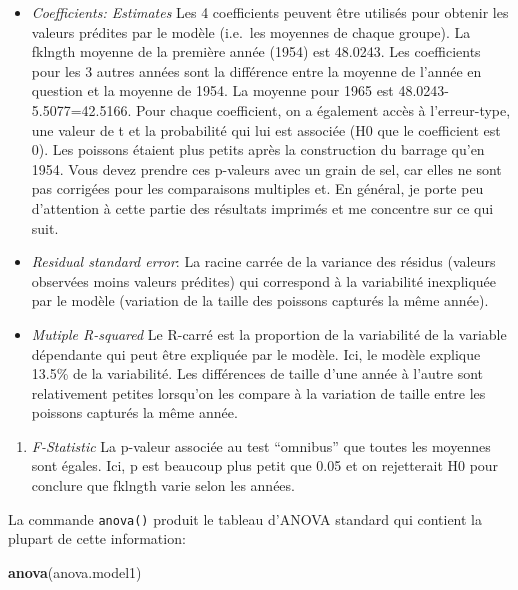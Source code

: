 \documentclass[
  12pt,
]{book}
\newenvironment{Shaded}{\begin{snugshade}}{\end{snugshade}}
\newcommand{\KeywordTok}[1]{\textcolor[rgb]{0.13,0.29,0.53}{\textbf{#1}}}
\newcommand{\NormalTok}[1]{#1}
\providecommand{\tightlist}{%
  \setlength{\itemsep}{0pt}\setlength{\parskip}{0pt}}
\begin{document}
\begin{itemize}
\tightlist
\item
  \emph{Coefficients: Estimates} Les 4 coefficients peuvent être utilisés pour obtenir les valeurs prédites par le modèle (i.e.~les moyennes de chaque groupe). La fklngth moyenne de la première année (1954) est 48.0243. Les coefficients pour les 3 autres années sont la différence entre la moyenne de l'année en question et la moyenne de 1954. La moyenne pour 1965 est 48.0243-5.5077=42.5166. Pour chaque coefficient, on a également accès à l'erreur-type, une valeur de t et la probabilité qui lui est associée (H0 que le coefficient est 0). Les poissons étaient plus petits après la construction du barrage qu'en 1954. Vous devez prendre ces p-valeurs avec un grain de sel, car elles ne sont pas corrigées pour les comparaisons multiples et. En général, je porte peu d'attention à cette partie des résultats imprimés et me concentre sur ce qui suit.
\item
  \emph{Residual standard error}: La racine carrée de la variance des résidus (valeurs observées moins valeurs prédites) qui correspond à la variabilité inexpliquée par le modèle (variation de la taille des poissons capturés la même année).
\item
  \emph{Mutiple R-squared} Le R-carré est la proportion de la variabilité de la variable dépendante qui peut être expliquée par le modèle. Ici, le modèle explique 13.5\% de la variabilité. Les différences de taille d'une année à l'autre sont relativement petites lorsqu'on les compare à la variation de taille entre les poissons capturés la même année.
\end{itemize}

\begin{enumerate}
\def\labelenumi{\arabic{enumi}.}
\setcounter{enumi}{3}
\tightlist
\item
  \emph{F-Statistic} La p-valeur associée au test ``omnibus'' que toutes les moyennes sont égales. Ici, p est beaucoup plus petit que 0.05 et on rejetterait H0 pour conclure que fklngth varie selon les années.
\end{enumerate}

La commande \texttt{anova()} produit le tableau d'ANOVA standard qui contient la plupart de cette information:

\begin{Shaded}
\begin{Highlighting}[]
\KeywordTok{anova}\NormalTok{(anova.model1)}
\end{Highlighting}
\end{Shaded}
\end{document}
